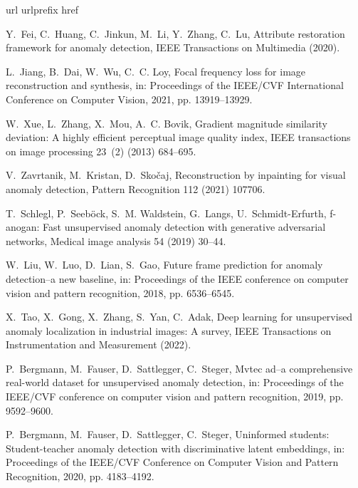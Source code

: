 \documentclass[5p, twocolumn]{elsarticle}[draft]
\begin{document}
\begin{thebibliography}{10}
\expandafter\ifx\csname url\endcsname\relax
  \def\url#1{\texttt{#1}}\fi
\expandafter\ifx\csname urlprefix\endcsname\relax\def\urlprefix{URL }\fi
\expandafter\ifx\csname href\endcsname\relax
  \def\href#1#2{#2} \def\path#1{#1}\fi

Y.~Fei, C.~Huang, C.~Jinkun, M.~Li, Y.~Zhang, C.~Lu, Attribute restoration
  framework for anomaly detection, IEEE Transactions on Multimedia (2020).

L.~Jiang, B.~Dai, W.~Wu, C.~C. Loy, Focal frequency loss for image
  reconstruction and synthesis, in: Proceedings of the IEEE/CVF International
  Conference on Computer Vision, 2021, pp. 13919--13929.

W.~Xue, L.~Zhang, X.~Mou, A.~C. Bovik, Gradient magnitude similarity deviation:
  A highly efficient perceptual image quality index, IEEE transactions on image
  processing 23~(2) (2013) 684--695.

V.~Zavrtanik, M.~Kristan, D.~Sko{\v{c}}aj, Reconstruction by inpainting for
  visual anomaly detection, Pattern Recognition 112 (2021) 107706.

T.~Schlegl, P.~Seeb{\"o}ck, S.~M. Waldstein, G.~Langs, U.~Schmidt-Erfurth,
  f-anogan: Fast unsupervised anomaly detection with generative adversarial
  networks, Medical image analysis 54 (2019) 30--44.

W.~Liu, W.~Luo, D.~Lian, S.~Gao, Future frame prediction for anomaly
  detection--a new baseline, in: Proceedings of the IEEE conference on computer
  vision and pattern recognition, 2018, pp. 6536--6545.

X.~Tao, X.~Gong, X.~Zhang, S.~Yan, C.~Adak, Deep learning for unsupervised
  anomaly localization in industrial images: A survey, IEEE Transactions on
  Instrumentation and Measurement (2022).

P.~Bergmann, M.~Fauser, D.~Sattlegger, C.~Steger, Mvtec ad--a comprehensive
  real-world dataset for unsupervised anomaly detection, in: Proceedings of the
  IEEE/CVF conference on computer vision and pattern recognition, 2019, pp.
  9592--9600.

P.~Bergmann, M.~Fauser, D.~Sattlegger, C.~Steger, Uninformed students:
  Student-teacher anomaly detection with discriminative latent embeddings, in:
  Proceedings of the IEEE/CVF Conference on Computer Vision and Pattern
  Recognition, 2020, pp. 4183--4192.


\end{thebibliography}
\end{document}

